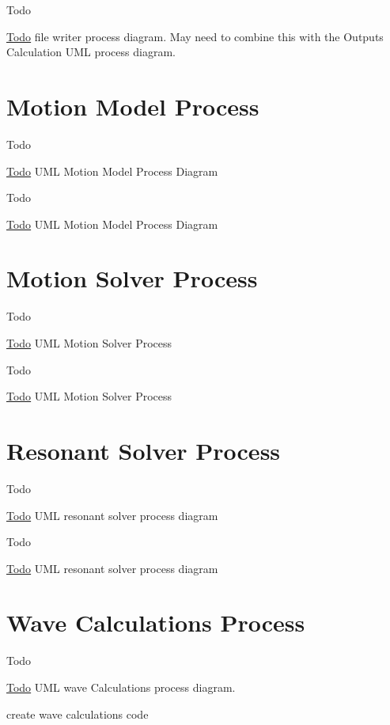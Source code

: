 \begin{DoxyRefDesc}{Todo}
\item[\hyperlink{todo__todo000025}{Todo}]file writer process diagram. May need to combine this with the Outputs Calculation U\-M\-L process diagram.\end{DoxyRefDesc}
\hypertarget{UML_MotionModel}{}\section{Motion Model Process}\label{UML_MotionModel}
\begin{DoxyRefDesc}{Todo}
\item[\hyperlink{todo__todo000003}{Todo}]U\-M\-L Motion Model Process Diagram\end{DoxyRefDesc}


\begin{DoxyRefDesc}{Todo}
\item[\hyperlink{todo__todo000012}{Todo}]U\-M\-L Motion Model Process Diagram\end{DoxyRefDesc}
\hypertarget{UML_MotionSolver}{}\section{Motion Solver Process}\label{UML_MotionSolver}
\begin{DoxyRefDesc}{Todo}
\item[\hyperlink{todo__todo000004}{Todo}]U\-M\-L Motion Solver Process\end{DoxyRefDesc}


\begin{DoxyRefDesc}{Todo}
\item[\hyperlink{todo__todo000015}{Todo}]U\-M\-L Motion Solver Process\end{DoxyRefDesc}
\hypertarget{UML_ResonantSolver}{}\section{Resonant Solver Process}\label{UML_ResonantSolver}
\begin{DoxyRefDesc}{Todo}
\item[\hyperlink{todo__todo000007}{Todo}]U\-M\-L resonant solver process diagram\end{DoxyRefDesc}


\begin{DoxyRefDesc}{Todo}
\item[\hyperlink{todo__todo000021}{Todo}]U\-M\-L resonant solver process diagram\end{DoxyRefDesc}
\hypertarget{UML_WaveCalculation}{}\section{Wave Calculations Process}\label{UML_WaveCalculation}
\begin{DoxyRefDesc}{Todo}
\item[\hyperlink{todo__todo000008}{Todo}]U\-M\-L wave Calculations process diagram. 

create wave calculations code\end{DoxyRefDesc}


